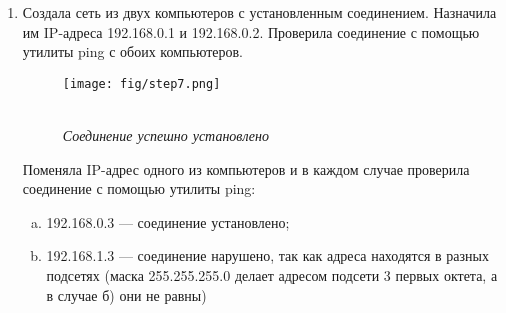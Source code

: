 \begin{enumerate}
Открыла форму настроек интерфейса FastEthernet0 для обоих компьютеров. Исследовала
первые три позиции в списке настроек:
	\begin{itemize}
	\item Port Status --- состояние порта (включен/выключен)
	\item Bandwidth --- пропускная способность канала (100/10 Мбит)
	\item Duplex --- режим работы приемо-передающих устройств (на прием и передачу/либо на прием, либо на передачу)
	\end{itemize}
Определила, что при одних сочетаниях настроек соединение будет установлено, а при других --- нарушено.
\begin{figure}[h!]
\begin{multicols}{2}
\hfill
\texttt{[image: fig/step5.png]}
\hfill
\caption*{\\[-35 pt] \it <<Рабочие>> сочетания настроек}
\label{figLeft}
\hfill
\texttt{[image: fig/step6.png]}
\hfill
\caption*{\\[-35 pt] \it Настройки, не позволяющие установить соединение}
\label{figRight}
\end{multicols}
\end{figure}

Соединение устанавливается только тогда, когда позиции 2 и 3 настроены одинаково, а Port Status = <<On>>.

\item Создала сеть из двух компьютеров с установленным соединением.
Назначила им IP-адреса 192.168.0.1 и 192.168.0.2. Проверила
соединение с помощью утилиты ping с обоих компьютеров.\\
  \begin{figure}[h!]
    \centering
    \texttt{[image: fig/step7.png]}
    \caption*{\\[-35 pt] \it Соединение успешно установлено}
  \end{figure}

Поменяла IP-адрес одного из компьютеров и в каждом случае проверила соединение с помощью утилиты ping:
	\begin{enumerate}[a)]
	\item 192.168.0.3 --- соединение установлено;
	\item 192.168.1.3 --- соединение нарушено, так как адреса
	находятся в разных подсетях (маска 255.255.255.0 делает адресом подсети 3 первых октета, а в случае б) они не равны)
	\end{enumerate}
	

\end{enumerate}
